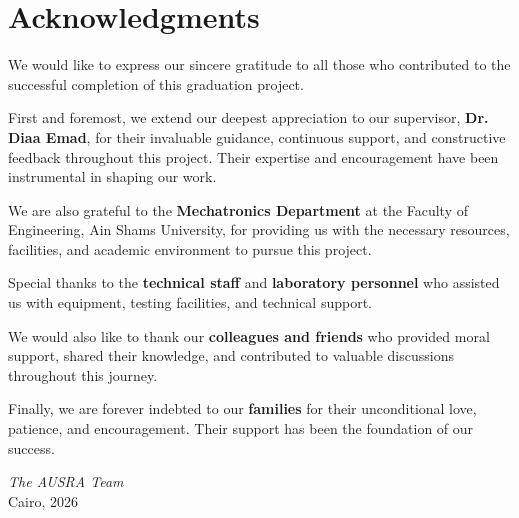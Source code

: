 
\chapter*{Acknowledgments}

We would like to express our sincere gratitude to all those who contributed to the successful completion of this graduation project.

First and foremost, we extend our deepest appreciation to our supervisor, \textbf{Dr. Diaa Emad}, for their invaluable guidance, continuous support, and constructive feedback throughout this project. Their expertise and encouragement have been instrumental in shaping our work.

We are also grateful to the \textbf{Mechatronics Department} at the Faculty of Engineering, Ain Shams University, for providing us with the necessary resources, facilities, and academic environment to pursue this project.

Special thanks to the \textbf{technical staff} and \textbf{laboratory personnel} who assisted us with equipment, testing facilities, and technical support.

We would also like to thank our \textbf{colleagues and friends} who provided moral support, shared their knowledge, and contributed to valuable discussions throughout this journey.

Finally, we are forever indebted to our \textbf{families} for their unconditional love, patience, and encouragement. Their support has been the foundation of our success.

\vspace{1cm}
\begin{flushright}
\textit{The AUSRA Team}\\
Cairo, 2026
\end{flushright}
